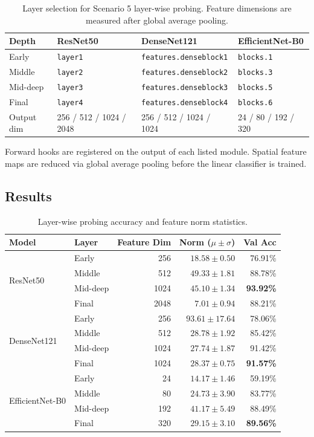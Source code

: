 \documentclass[11pt, a4paper]{article}
\begin{document}
\begin{table}[H]
\centering
\caption{Layer selection for Scenario 5 layer-wise probing. Feature dimensions are measured after global average pooling.}
\label{tab:s5_layers}
\begin{tabular}{llll}
\toprule
\textbf{Depth} & \textbf{ResNet50} & \textbf{DenseNet121} & \textbf{EfficientNet-B0} \\
\midrule
Early    & \texttt{layer1} & \texttt{features.denseblock1} & \texttt{blocks.1} \\
Middle   & \texttt{layer2} & \texttt{features.denseblock2} & \texttt{blocks.3} \\
Mid-deep & \texttt{layer3} & \texttt{features.denseblock3} & \texttt{blocks.5} \\
Final    & \texttt{layer4} & \texttt{features.denseblock4} & \texttt{blocks.6} \\
\midrule
Output dim & 256 / 512 / 1024 / 2048 & 256 / 512 / 1024 / 1024 & 24 / 80 / 192 / 320 \\
\bottomrule
\end{tabular}
\end{table}

Forward hooks are registered on the output of each listed module. Spatial feature maps are reduced via global average pooling before the linear classifier is trained.

\subsection{Results}

\begin{table}[H]
\centering
\caption{Layer-wise probing accuracy and feature norm statistics.}
\label{tab:s5}
\begin{tabular}{llrrr}
\toprule
\textbf{Model} & \textbf{Layer} & \textbf{Feature Dim} & \textbf{Norm ($\mu \pm \sigma$)} & \textbf{Val Acc} \\
\midrule
\multirow{4}{*}{ResNet50} & Early & 256 & $18.58 \pm 0.50$ & 76.91\% \\
& Middle & 512 & $49.33 \pm 1.81$ & 88.78\% \\
& Mid-deep & 1024 & $45.10 \pm 1.34$ & \textbf{93.92\%} \\
& Final & 2048 & $7.01 \pm 0.94$ & 88.21\% \\
\midrule
\multirow{4}{*}{DenseNet121} & Early & 256 & $93.61 \pm 17.64$ & 78.06\% \\
& Middle & 512 & $28.78 \pm 1.92$ & 85.42\% \\
& Mid-deep & 1024 & $27.74 \pm 1.87$ & 91.42\% \\
& Final & 1024 & $28.37 \pm 0.75$ & \textbf{91.57\%} \\
\midrule
\multirow{4}{*}{EfficientNet-B0} & Early & 24 & $14.17 \pm 1.46$ & 59.19\% \\
& Middle & 80 & $24.73 \pm 3.90$ & 83.77\% \\
& Mid-deep & 192 & $41.17 \pm 5.49$ & 88.49\% \\
& Final & 320 & $29.15 \pm 3.10$ & \textbf{89.56\%} \\
\bottomrule
\end{tabular}
\end{table}
\end{document}
